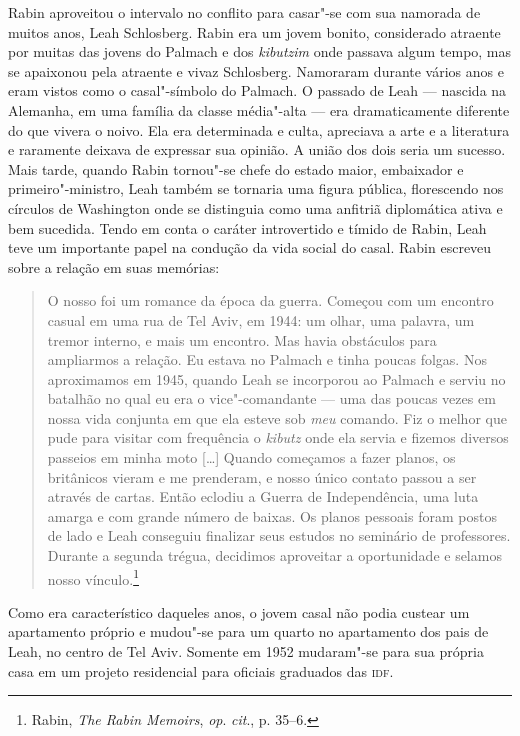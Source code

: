 Rabin aproveitou o intervalo no conflito para casar"-se com sua namorada
de muitos anos, Leah Schlosberg. Rabin era um jovem bonito, considerado
atraente por muitas das jovens do Palmach e dos \emph{kibutzim} onde passava
algum tempo, mas se apaixonou pela atraente e vivaz Schlosberg.
Namoraram durante vários anos e eram vistos como o casal"-símbolo do
Palmach. O passado de Leah --- nascida na Alemanha, em uma família da
classe média"-alta --- era dramaticamente diferente do que vivera o noivo.
Ela era determinada e culta, apreciava a arte e a literatura e raramente
deixava de expressar sua opinião. A união dos dois seria um sucesso. Mais
tarde, quando Rabin tornou"-se chefe do estado maior, embaixador e
primeiro"-ministro, Leah também se tornaria uma figura pública,
florescendo nos círculos de Washington onde se distinguia como uma
anfitriã diplomática ativa e bem sucedida. Tendo em conta o caráter
introvertido e tímido de Rabin, Leah teve um importante papel na
condução da vida social do casal. Rabin escreveu sobre a relação em suas
memórias:

\begin{quote}
O nosso foi um romance da época da guerra. Começou com um encontro
casual em uma rua de Tel Aviv, em 1944: um olhar, uma palavra, um tremor
interno, e mais um encontro. Mas havia obstáculos para ampliarmos a
relação. Eu estava no Palmach e tinha poucas folgas. Nos aproximamos em
1945, quando Leah se incorporou ao Palmach e serviu no batalhão no qual
eu era o vice"-comandante --- uma das poucas vezes em nossa vida conjunta
em que ela esteve sob \emph{meu} comando. Fiz o melhor que pude para
visitar com frequência o \emph{kibutz} onde ela servia e fizemos diversos
passeios em minha moto {[}\ldots{}{]} Quando começamos a fazer planos, os britânicos
vieram e me prenderam, e nosso único contato passou a ser através de
cartas. Então eclodiu a Guerra de Independência, uma luta amarga e com
grande número de baixas. Os planos pessoais foram postos de lado e Leah
conseguiu finalizar seus estudos no seminário de professores. Durante a
segunda trégua, decidimos aproveitar a oportunidade e selamos nosso
vínculo.\footnote{Rabin, \emph{The Rabin Memoirs}, \emph{op}. \emph{cit}., p. 35--6.}
\end{quote}

Como era característico daqueles anos, o jovem casal não podia custear
um apartamento próprio e mudou"-se para um quarto no apartamento
dos pais de Leah, no centro de Tel Aviv. Somente em 1952 mudaram"-se para
sua própria casa em um projeto residencial para oficiais graduados das
\textsc{idf}.

